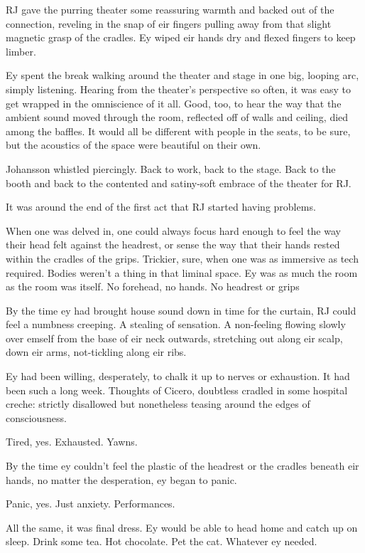 RJ gave the purring theater some reassuring warmth and backed out of the connection, reveling in the snap of eir fingers pulling away from that slight magnetic grasp of the cradles. Ey wiped eir hands dry and flexed fingers to keep limber.

Ey spent the break walking around the theater and stage in one big, looping arc, simply listening. Hearing from the theater's perspective so often, it was easy to get wrapped in the omniscience of it all. Good, too, to hear the way that the ambient sound moved through the room, reflected off of walls and ceiling, died among the baffles. It would all be different with people in the seats, to be sure, but the acoustics of the space were beautiful on their own.

Johansson whistled piercingly. Back to work, back to the stage. Back to the booth and back to the contented and satiny-soft embrace of the theater for RJ.

It was around the end of the first act that RJ started having problems.

When one was delved in, one could always focus hard enough to feel the way their head felt against the headrest, or sense the way that their hands rested within the cradles of the grips. Trickier, sure, when one was as immersive as tech required. Bodies weren't a thing in that liminal space. Ey was as much the room as the room was itself. No forehead, no hands. No headrest or grips

By the time ey had brought house sound down in time for the curtain, RJ could feel a numbness creeping. A stealing of sensation. A non-feeling flowing slowly over emself from the base of eir neck outwards, stretching out along eir scalp, down eir arms, not-tickling along eir ribs.

Ey had been willing, desperately, to chalk it up to nerves or exhaustion. It had been such a long week. Thoughts of Cicero, doubtless cradled in some hospital creche: strictly disallowed but nonetheless teasing around the edges of consciousness.

Tired, yes. Exhausted. Yawns.

By the time ey couldn't feel the plastic of the headrest or the cradles beneath eir hands, no matter the desperation, ey began to panic.

Panic, yes. Just anxiety. Performances.

All the same, it was final dress. Ey would be able to head home and catch up on sleep. Drink some tea. Hot chocolate. Pet the cat. Whatever ey needed.


